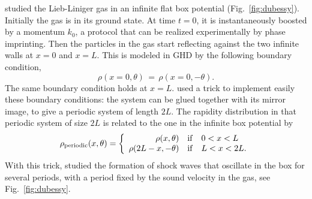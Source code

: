 \documentclass[onecolumn,amsfonts,showpacs,superscriptaddress]{revtex4-1}
\begin{document}
\vspace{0.5cm}

\cite{dubessy2021universal} studied the Lieb-Liniger gas in an infinite flat box potential (Fig.~\ref{fig:dubessy}). Initially the gas is in its ground state. At time $t=0$, it is instantaneously boosted by a momentum $k_0$, a protocol that can be realized experimentally by phase imprinting. Then the particles in the gas start reflecting against the two infinite walls at $x=0$ and $x=L$. This is modeled in GHD by the following boundary condition,
\begin{equation}
    \label{eq:wall_boundary_conditions}
    \rho(x = 0, \theta) \, = \, \rho(x = 0, -\theta) .
\end{equation}
The same boundary condition holds at $x=L$. \cite{dubessy2021universal} used a trick to implement easily  these boundary conditions: the system can be glued together with its mirror image, to give a periodic system of length $2L$. The rapidity distribution in that periodic system of size $2L$ is related to the one in the infinite box potential by
\begin{equation}
    \rho_{\rm periodic}(x,\theta) = \left\{ \begin{array}{rcl} \rho (x, \theta)  &{\rm if}& 0 < x < L \\
    \rho (2L-x, -\theta)  &{\rm if}& L < x < 2L.
    \end{array} \right.
\end{equation}
With this trick, \cite{dubessy2021universal} studied the formation of shock waves that oscillate in the box for several  periods, with a period fixed by the sound velocity in the gas, see Fig.~\ref{fig:dubessy}.



\vspace{0.5cm}
\end{document}
